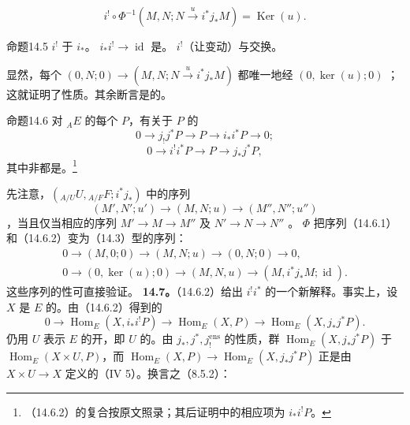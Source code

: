\[i^!\circ\Phi^{-1}(M,N;N\xrightarrow{u}i^*j_*M)=\operatorname{Ker}(u).\tag{14.4.2}\]
\begin{SGAresult}{命题}{14.5}
 $i^!$ 于 $i_*$。 $i_*i^!\to\operatorname{id}$ 是。 $i^!$（让变动）与交换。
\end{SGAresult}
显然，每个 $(0,N;0)\to(M,N;N\xrightarrow{u}i^*j_*M)$ 都唯一地经 $(0,\ker(u);0)$ ；这就证明了性质。其余断言是的。
\begin{SGAresult}{命题}{14.6}
对 ${}_AE$ 的每个 $P$，有关于 $P$ 的
\[0\longrightarrow j_!j^*P\longrightarrow P\longrightarrow i_*i^*P\longrightarrow0;\tag{14.6.1}\]
\[0\longrightarrow i^!i^*P\longrightarrow P\longrightarrow j_*j^*P,\tag{14.6.2}\]
其中非都是。\footnote{（14.6.2）的复合按原文照录；其后证明中的相应项为 $i_*i^!P$。}
\end{SGAresult}
先注意，$({}_{A/U}U,{}_{A/F}F;i^*j_*)$ 中的序列
\[(M',N';u')\longrightarrow(M,N;u)\longrightarrow(M'',N'';u'')\]
，当且仅当相应的序列 $M'\to M\to M''$ 及 $N'\to N\to N''$ 。
 $\Phi$ 把序列（14.6.1）和（14.6.2）变为（14.3）型的序列：
\[
\begin{gathered}
0\longrightarrow(M,0;0)\longrightarrow(M,N;u)\longrightarrow(0,N;0)\longrightarrow0,\\
0\longrightarrow(0,\ker(u);0)\longrightarrow(M,N,u)\longrightarrow(M,i^*j_*M;\operatorname{id}).
\end{gathered}
\]
这些序列的性可直接验证。
\textbf{14.7。}（14.6.2）给出 $i^!i^*$ 的一个新解释。事实上，设 $X$ 是 $E$ 的。由（14.6.2）得到的
\[0\longrightarrow\operatorname{Hom}_E(X,i_*i^!P)\longrightarrow\operatorname{Hom}_E(X,P)\longrightarrow\operatorname{Hom}_E(X,j_*j^*P).\]
仍用 $U$ 表示 $E$ 的开，即 $U$ 的。由 $j_*,j^*,j_!^{\mathrm{ens}}$ 的性质，群 $\operatorname{Hom}_E(X,j_*j^*P)$ 于 $\operatorname{Hom}_E(X\times U,P)$，而 $\operatorname{Hom}_E(X,P)\to\operatorname{Hom}_E(X,j_*j^*P)$ 正是由 $X\times U\to X$ 定义的（IV 5）。换言之（8.5.2）：
